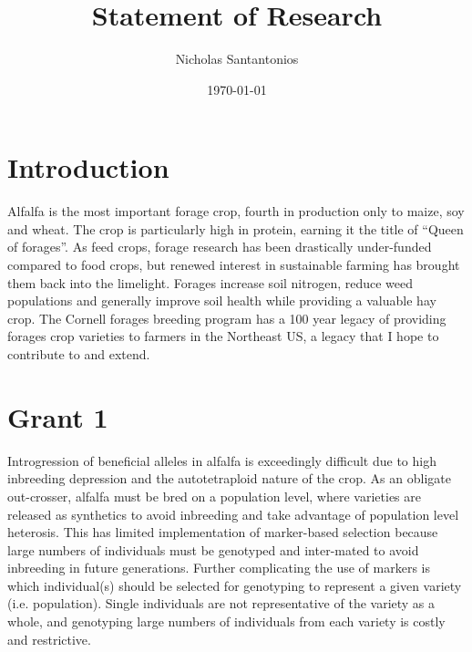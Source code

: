 \documentclass[10pt]{article}
\title{Statement of Research}
\author{Nicholas Santantonios}
\date{\today}
\begin{document}
\section*{Introduction}

Alfalfa is the most important forage crop, fourth in production only to maize, soy and wheat. The crop is particularly high in protein, earning it the title of ``Queen of forages''. As feed crops, forage research has been drastically under-funded compared to food crops, but renewed interest in sustainable farming has brought them back into the limelight. Forages increase soil nitrogen, reduce weed populations and generally improve soil health while providing a valuable hay crop. The Cornell forages breeding program has a 100 year legacy of providing forages crop varieties to farmers in the Northeast US, a legacy that I hope to contribute to and extend. 

\section*{Grant 1}

Introgression of beneficial alleles in alfalfa is exceedingly difficult due to high inbreeding depression and the autotetraploid nature of the crop. As an obligate out-crosser, alfalfa must be bred on a population level, where varieties are released as synthetics to avoid inbreeding and take advantage of population level heterosis. This has limited implementation of marker-based selection because large numbers of individuals must be genotyped and inter-mated to avoid inbreeding in future generations. Further complicating the use of markers is which individual(s) should be selected for genotyping to represent a given variety (i.e. population). Single individuals are not representative of the variety as a whole, and genotyping large numbers of individuals from each variety is costly and restrictive.
\end{document}
